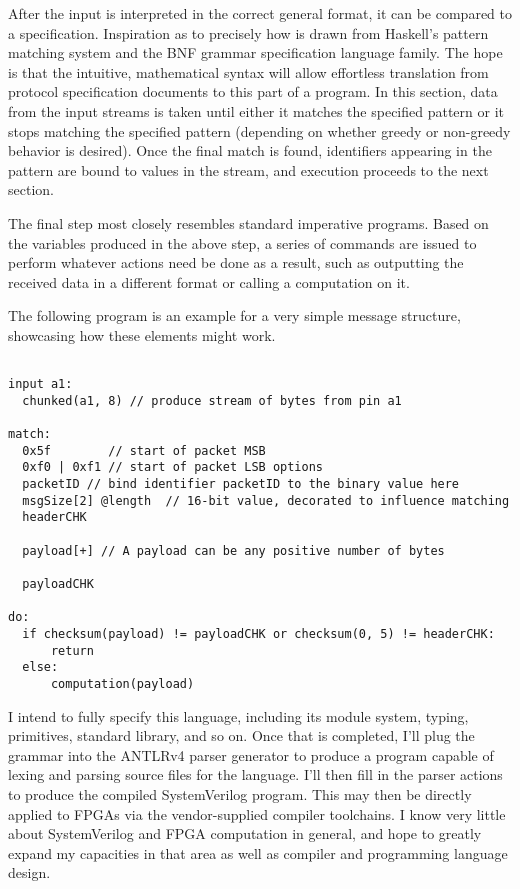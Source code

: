 \documentclass[12pt, arial, letterpaper]{article}
\begin{document}
After the input is interpreted in the correct general format, it can be compared to a specification. Inspiration as to precisely how is drawn from Haskell's pattern matching system \cite{Marlow_haskell2010} and the BNF grammar specification  language family\cite{bnf}. The hope is that the intuitive, mathematical syntax will allow effortless translation from protocol specification documents to this part of a program. In this section, data from the input streams is taken until either it matches the specified pattern or it stops matching the specified pattern (depending on whether greedy or non-greedy behavior is desired). Once the final match is found, identifiers appearing in the pattern are bound to values in the stream, and execution proceeds to the next section.
\newline

The final step most closely resembles standard imperative programs. Based on the variables produced in the above step, a series of commands are issued to perform whatever actions need be done as a result, such as outputting the received data in a different format or calling a computation on it.
\newline

The following program is an example for a very simple message structure, showcasing how these elements might work.
\begin{verbatim}

input a1:
  chunked(a1, 8) // produce stream of bytes from pin a1

match:
  0x5f        // start of packet MSB
  0xf0 | 0xf1 // start of packet LSB options
  packetID // bind identifier packetID to the binary value here
  msgSize[2] @length  // 16-bit value, decorated to influence matching
  headerCHK

  payload[+] // A payload can be any positive number of bytes 

  payloadCHK

do:
  if checksum(payload) != payloadCHK or checksum(0, 5) != headerCHK:
      return
  else:
      computation(payload)

\end{verbatim}


I intend to fully specify this language, including its module system, typing, primitives, standard library, and so on. Once that is completed, I'll plug the grammar into the ANTLRv4 parser generator \cite{antlr} to produce a program capable of lexing and parsing source files for the language. I'll then fill in the parser actions to produce the compiled SystemVerilog program. This may then be directly applied to FPGAs via the vendor-supplied compiler toolchains.
I know very little about SystemVerilog and FPGA computation in general, and hope to greatly expand my capacities in that area as well as compiler and programming language design.
\newline
\end{document}
